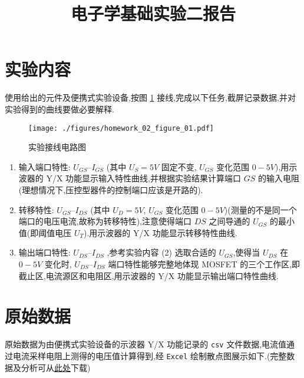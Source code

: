 
\usepackage{../../homeworks_preamble}
\title{电子学基础实验二报告}


    \pagestyle{empty}
    \maketitle
    \section{实验内容}
        使用给出的元件及便携式实验设备,按图 \ref{figure:01} 接线,完成以下任务,截屏记录数据,并对实验得到的曲线要做必要解释.
        \begin{figure}[htbp]
            \centering
            \texttt{[image: ./figures/homework\_02\_figure\_01.pdf]}
            \caption{实验接线电路图}
            \label{figure:01}
        \end{figure}
        \begin{enumerate}
            \item 输入端口特性: $U_{GS} – I_{GS}$ (其中 $U_{S}=5V$ 固定不变, $U_{GS}$ 变化范围 $0-5V$),用示波器的 Y/X 功能显示输入特性曲线,并根据实验结果计算端口 $GS$ 的输入电阻(理想情况下,压控型器件的控制端口应该是开路的).
            \item 转移特性: $U_{GS} – I_{DS}$ (其中 $U_{D}=5V$, $U_{GS}$ 变化范围 $0-5V$)(测量的不是同一个端口的电压电流,故称为转移特性),注意使得端口 $DS$ 之间导通的 $U_{GS}$ 的最小值(即阈值电压 $U_{T}$).用示波器的 Y/X 功能显示转移特性曲线.
            \item 输出端口特性: $U_{DS} – I_{DS}$ ,参考实验内容 (2) 选取合适的 $U_{GS}$,使得当 $U_{DS}$ 在 $0-5V$ 变化时, $U_{DS} – I_{DS}$ 端口特性能够完整地体现 MOSFET 的三个工作区,即截止区,电流源区和电阻区,用示波器的 Y/X 功能显示输出端口特性曲线.
        \end{enumerate}
    \section{原始数据}
    原始数据为由便携式实验设备的示波器 Y/X 功能记录的 \texttt{csv} 文件数据,电流值通过电流采样电阻上测得的电压值计算得到,经 \texttt{Excel} 绘制散点图展示如下.(完整数据及分析可从\href{https://cloud.tsinghua.edu.cn/d/72e4a2c87e694f9d9a4d/}{此处}下载)
        \begin{figure}[htbp]
            \centering
            \vspace{20pt}
        \end{figure}
        \begin{figure}[htbp]
            \centering
        \end{figure}

